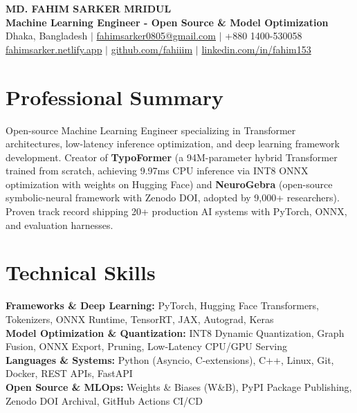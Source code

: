 \documentclass[9.5pt,a4paper]{article}
\begin{document}
{\centering
    {\Large \textbf{MD. FAHIM SARKER MRIDUL}}\\[1pt]
    \textbf{Machine Learning Engineer - Open Source \& Model Optimization}\\[1pt]
    Dhaka, Bangladesh \;$\vert$\; \href{mailto:fahimsarker0805@gmail.com}{fahimsarker0805@gmail.com} \;$\vert$\; +880 1400-530058\\[1pt]
    \href{https://fahimsarker.netlify.app}{fahimsarker.netlify.app} \;$\vert$\; \href{https://github.com/fahiiim}{github.com/fahiiim} \;$\vert$\; \href{https://linkedin.com/in/fahim153}{linkedin.com/in/fahim153}\par
}

\vspace{-2.5pt}
\section*{Professional Summary}
Open-source Machine Learning Engineer specializing in Transformer architectures, low-latency inference optimization, and deep learning framework development. Creator of \textbf{TypoFormer} (a 94M-parameter hybrid Transformer trained from scratch, achieving 9.97ms CPU inference via INT8 ONNX optimization with weights on Hugging Face) and \textbf{NeuroGebra} (open-source symbolic-neural framework with Zenodo DOI, adopted by 9,000+ researchers). Proven track record shipping 20+ production AI systems with PyTorch, ONNX, and evaluation harnesses.

\section*{Technical Skills}
\noindent
\textbf{Frameworks \& Deep Learning:} PyTorch, Hugging Face Transformers, Tokenizers, ONNX Runtime, TensorRT, JAX, Autograd, Keras\\
\textbf{Model Optimization \& Quantization:} INT8 Dynamic Quantization, Graph Fusion, ONNX Export, Pruning, Low-Latency CPU/GPU Serving\\
\textbf{Languages \& Systems:} Python (Asyncio, C-extensions), C++, Linux, Git, Docker, REST APIs, FastAPI\\
\textbf{Open Source \& MLOps:} Weights \& Biases (W\&B), PyPI Package Publishing, Zenodo DOI Archival, GitHub Actions CI/CD
\end{document}
